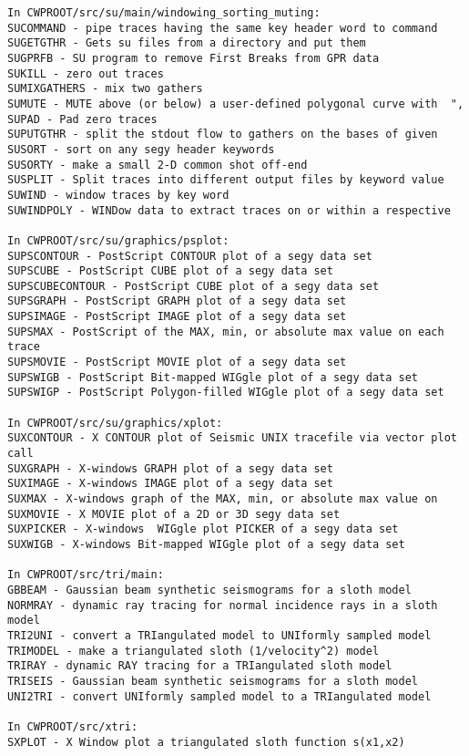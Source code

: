 {{\begin{verbatim}
In CWPROOT/src/su/main/windowing_sorting_muting:
SUCOMMAND - pipe traces having the same key header word to command	
SUGETGTHR - Gets su files from a directory and put them               
SUGPRFB - SU program to remove First Breaks from GPR data		
SUKILL - zero out traces					
SUMIXGATHERS - mix two gathers					
SUMUTE - MUTE above (or below) a user-defined polygonal curve with	", 
SUPAD - Pad zero traces						
SUPUTGTHR - split the stdout flow to gathers on the bases of given	
SUSORT - sort on any segy header keywords			
SUSORTY - make a small 2-D common shot off-end  		
SUSPLIT - Split traces into different output files by keyword value	
SUWIND - window traces by key word					
SUWINDPOLY - WINDow data to extract traces on or within a respective	

In CWPROOT/src/su/graphics/psplot:
SUPSCONTOUR - PostScript CONTOUR plot of a segy data set		
SUPSCUBE - PostScript CUBE plot of a segy data set			
SUPSCUBECONTOUR - PostScript CUBE plot of a segy data set		
SUPSGRAPH - PostScript GRAPH plot of a segy data set			
SUPSIMAGE - PostScript IMAGE plot of a segy data set			
SUPSMAX - PostScript of the MAX, min, or absolute max value on each trace
SUPSMOVIE - PostScript MOVIE plot of a segy data set			
SUPSWIGB - PostScript Bit-mapped WIGgle plot of a segy data set	
SUPSWIGP - PostScript Polygon-filled WIGgle plot of a segy data set	

In CWPROOT/src/su/graphics/xplot:
SUXCONTOUR - X CONTOUR plot of Seismic UNIX tracefile via vector plot call
SUXGRAPH - X-windows GRAPH plot of a segy data set			
SUXIMAGE - X-windows IMAGE plot of a segy data set	                
SUXMAX - X-windows graph of the MAX, min, or absolute max value on	
SUXMOVIE - X MOVIE plot of a 2D or 3D segy data set 			
SUXPICKER - X-windows  WIGgle plot PICKER of a segy data set		
SUXWIGB - X-windows Bit-mapped WIGgle plot of a segy data set		

In CWPROOT/src/tri/main:
GBBEAM - Gaussian beam synthetic seismograms for a sloth model 	
NORMRAY - dynamic ray tracing for normal incidence rays in a sloth model
TRI2UNI - convert a TRIangulated model to UNIformly sampled model	
TRIMODEL - make a triangulated sloth (1/velocity^2) model                  		
TRIRAY - dynamic RAY tracing for a TRIangulated sloth model		
TRISEIS - Gaussian beam synthetic seismograms for a sloth model	
UNI2TRI - convert UNIformly sampled model to a TRIangulated model	

In CWPROOT/src/xtri:
SXPLOT - X Window plot a triangulated sloth function s(x1,x2)		


\end{verbatim}}}
